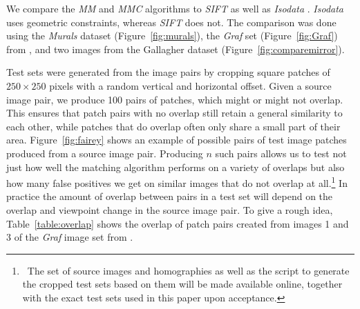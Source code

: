 \documentclass[conference]{IEEEtran}
\begin{document}


%
%
We compare the \emph{MM} and \emph{MMC} algorithms to 
\emph{SIFT} \cite{lowe2004sift} as well 
as \emph{Isodata} \cite{das2008event}. 
\emph{Isodata} uses geometric constraints, whereas \emph{SIFT} does not.
The 
comparison was done using the \emph{Murals} dataset (Figure~\ref{fig:murals}), the 
\emph{Graf} set (Figure~\ref{fig:Graf}) from \cite{mikolajczyk2005performance}, and two 
images %
from the Gallagher dataset \cite{gallagher2008} (Figure~\ref{fig:comparemirror}).

Test sets were generated from the image pairs by cropping square patches of
$250\!\times\!250$ pixels with a random vertical and horizontal offset.  
Given a source image pair, we produce 100 pairs of patches, which might or might not overlap.  
This ensures that patch pairs with no overlap still retain a general similarity to each 
other, while patches that do overlap often only share a small 
part of their area. Figure~\ref{fig:fairey} shows an example of 
possible pairs of test image patches produced from a source image pair.  
Producing $n$ such pairs allows us to test not just how well the 
matching algorithm performs on a variety of overlaps but also how many 
false positives we get on similar images that do not overlap at 
all.\footnote{~The set of source images and homographies as well as the 
script to generate the cropped test sets based on them will be made 
available online, together with the exact test sets used in this paper 
upon acceptance.}
In practice the amount of overlap between pairs in a test set will 
depend on the overlap and viewpoint change in the source image pair.  To 
give a rough idea, Table~\ref{table:overlap} 
shows the overlap of patch pairs created from images 1 and 3 of the 
\emph{Graf} image set from \cite{mikolajczyk2005performance}.
\end{document}
